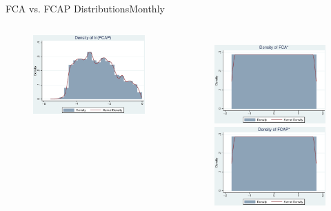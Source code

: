 \documentclass{beamer}
\begin{document}
\begin{frame}{FCA vs. FCAP Distributions}{Monthly}
\begin{columns}
\begin{figure}
				\includegraphics[width=\linewidth]{"MHistlnFCAP.eps"}
			\end{figure}
		\pause
			\begin{figure}   
				\centering
				\includegraphics[width=\linewidth]{"MHistNFCA.eps"}  \\
				\includegraphics[width=\linewidth]{"MHistNFCAP.eps"}   \end{figure}            
		\end{columns}
	\end{frame}
	
\end{document}
